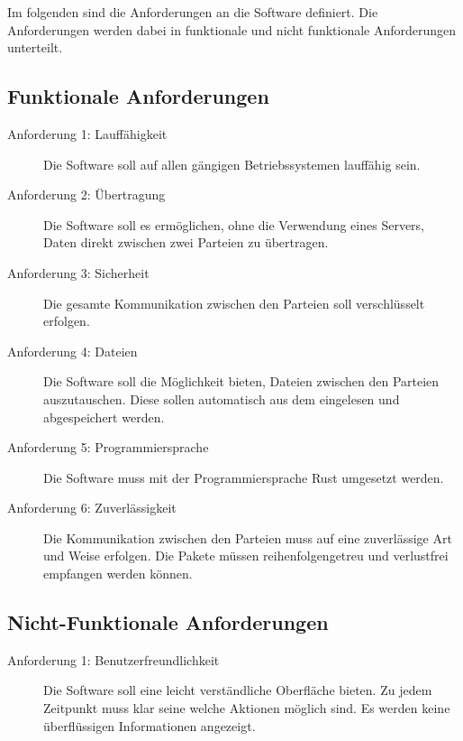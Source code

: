 Im folgenden sind die Anforderungen an die Software definiert. Die Anforderungen werden dabei in funktionale und nicht funktionale Anforderungen unterteilt.

\subsection*{Funktionale Anforderungen}
\begin{description}
\item[Anforderung 1: Lauffähigkeit] Die Software soll auf allen gängigen Betriebssystemen lauffähig sein.
\item[Anforderung 2: Übertragung] Die Software soll es ermöglichen, ohne die Verwendung eines Servers, Daten direkt zwischen zwei Parteien zu übertragen.
\item[Anforderung 3: Sicherheit] Die gesamte Kommunikation zwischen den Parteien soll verschlüsselt erfolgen.
\item[Anforderung 4: Dateien] Die Software soll die Möglichkeit bieten, Dateien zwischen den Parteien auszutauschen. Diese sollen automatisch aus dem eingelesen und abgespeichert werden.
\item[Anforderung 5: Programmiersprache] Die Software muss mit der Programmiersprache Rust umgesetzt werden.
\item[Anforderung 6: Zuverlässigkeit] Die Kommunikation zwischen den Parteien muss auf eine zuverlässige Art und Weise erfolgen. Die Pakete müssen reihenfolgengetreu und verlustfrei empfangen werden können.  
\end{description}

\subsection*{Nicht-Funktionale Anforderungen}
\begin{description}
\item[Anforderung 1: Benutzerfreundlichkeit] Die Software soll eine leicht verständliche Oberfläche bieten. Zu jedem Zeitpunkt muss klar seine welche Aktionen möglich sind. Es werden keine überflüssigen Informationen angezeigt.
\end{description}